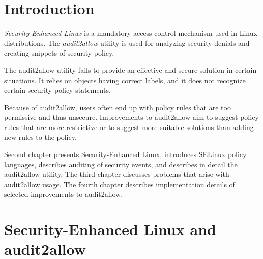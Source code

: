 \chapter{Introduction}

\emph{Security-Enhanced Linux} is a mandatory access control mechanism used in
Linux distributions. The \emph{audit2allow} utility is used for analyzing
security denials and creating snippets of security policy.

The audit2allow utility fails to provide an effective and secure solution in
certain situations. It relies on objects having correct labels, and it does not
recognize certain security policy statements.

Because of audit2allow, users often end up with policy rules that are too
permissive and thus unsecure.
Improvements to audit2allow aim to suggest policy rules that are more
restrictive or to suggest more suitable solutions than adding new rules to the
policy.

Second chapter presents Security-Enhanced Linux, introduces SELinux policy
languages, describes auditing of security events, and describes in detail the
audit2allow utility. The third chapter discusses problems that arise with
audit2allow usage. The fourth chapter describes implementation details of
selected improvements to audit2allow.

\chapter{Security-Enhanced Linux and audit2allow}

